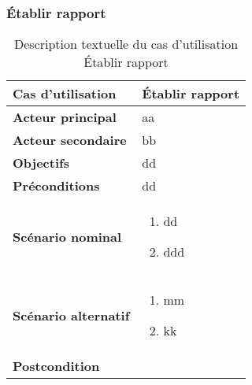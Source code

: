         \subsubsection[Établir rapport]{Établir rapport}
        \begin{longtable}{p{4cm} p{9cm}}
            \caption{Description textuelle du cas d’utilisation Établir rapport}
            \label{table:usecaseEtablirCompte}
            \\\hline\hline
                \textbf{Cas d’utilisation} & \textbf{Établir rapport}
            \\\hline\hline
                    \textbf{Acteur principal} & aa
                \\
                    \textbf{Acteur secondaire} & bb
                \\
                    \textbf{Objectifs} & dd
                \\
                    \textbf{Préconditions} & dd
                \\
                \textbf{Scénario nominal} &
                    \begin{enumerate}[leftmargin=*]
                        \item dd
                        \item ddd
                    \end{enumerate}
                \\
                \textbf{Scénario alternatif} &
                    \begin{enumerate}[leftmargin=*]
                        \item mm
                        \item kk
                    \end{enumerate}
                \\
                \textbf{Postcondition}
            \\\bottomrule
        \end{longtable}

